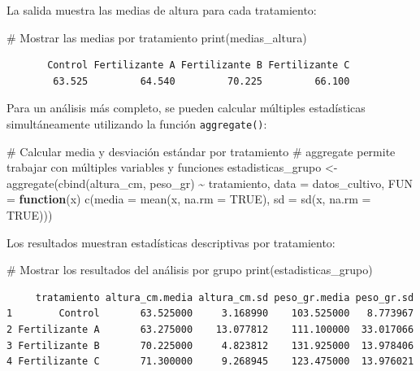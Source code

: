 \documentclass[
  spanish,
  a4paper,
  DIV=11,
  numbers=noendperiod,
  onepage,
  openany]{scrreprt}
\newenvironment{Shaded}{\begin{snugshade}}{\end{snugshade}}
\newcommand{\AttributeTok}[1]{\textcolor[rgb]{0.40,0.45,0.13}{#1}}
\newcommand{\CommentTok}[1]{\textcolor[rgb]{0.37,0.37,0.37}{#1}}
\newcommand{\ConstantTok}[1]{\textcolor[rgb]{0.56,0.35,0.01}{#1}}
\newcommand{\ControlFlowTok}[1]{\textcolor[rgb]{0.00,0.23,0.31}{\textbf{#1}}}
\newcommand{\FunctionTok}[1]{\textcolor[rgb]{0.28,0.35,0.67}{#1}}
\newcommand{\NormalTok}[1]{\textcolor[rgb]{0.00,0.23,0.31}{#1}}
\newcommand{\OtherTok}[1]{\textcolor[rgb]{0.00,0.23,0.31}{#1}}
\newcommand{\SpecialCharTok}[1]{\textcolor[rgb]{0.37,0.37,0.37}{#1}}
\begin{document}
La salida muestra las medias de altura para cada tratamiento:

\begin{Shaded}
\begin{Highlighting}[]
\CommentTok{\# Mostrar las medias por tratamiento}
\FunctionTok{print}\NormalTok{(medias\_altura)}
\end{Highlighting}
\end{Shaded}

\begin{verbatim}
       Control Fertilizante A Fertilizante B Fertilizante C 
        63.525         64.540         70.225         66.100 
\end{verbatim}

Para un análisis más completo, se pueden calcular múltiples estadísticas
simultáneamente utilizando la función \texttt{aggregate()}:

\begin{Shaded}
\begin{Highlighting}[]
\CommentTok{\# Calcular media y desviación estándar por tratamiento}
\CommentTok{\# aggregate permite trabajar con múltiples variables y funciones}
\NormalTok{estadisticas\_grupo }\OtherTok{\textless{}{-}} \FunctionTok{aggregate}\NormalTok{(}\FunctionTok{cbind}\NormalTok{(altura\_cm, peso\_gr) }\SpecialCharTok{\textasciitilde{}}\NormalTok{ tratamiento, }
                               \AttributeTok{data =}\NormalTok{ datos\_cultivo, }
                               \AttributeTok{FUN =} \ControlFlowTok{function}\NormalTok{(x) }
                                 \FunctionTok{c}\NormalTok{(}\AttributeTok{media =} \FunctionTok{mean}\NormalTok{(x, }\AttributeTok{na.rm =} \ConstantTok{TRUE}\NormalTok{), }
                                   \AttributeTok{sd =} \FunctionTok{sd}\NormalTok{(x, }\AttributeTok{na.rm =} \ConstantTok{TRUE}\NormalTok{)))}
\end{Highlighting}
\end{Shaded}

Los resultados muestran estadísticas descriptivas por tratamiento:

\begin{Shaded}
\begin{Highlighting}[]
\CommentTok{\# Mostrar los resultados del análisis por grupo}
\FunctionTok{print}\NormalTok{(estadisticas\_grupo)}
\end{Highlighting}
\end{Shaded}

\begin{verbatim}
     tratamiento altura_cm.media altura_cm.sd peso_gr.media peso_gr.sd
1        Control       63.525000     3.168990    103.525000   8.773967
2 Fertilizante A       63.275000    13.077812    111.100000  33.017066
3 Fertilizante B       70.225000     4.823812    131.925000  13.978406
4 Fertilizante C       71.300000     9.268945    123.475000  13.976021
\end{verbatim}
\end{document}
